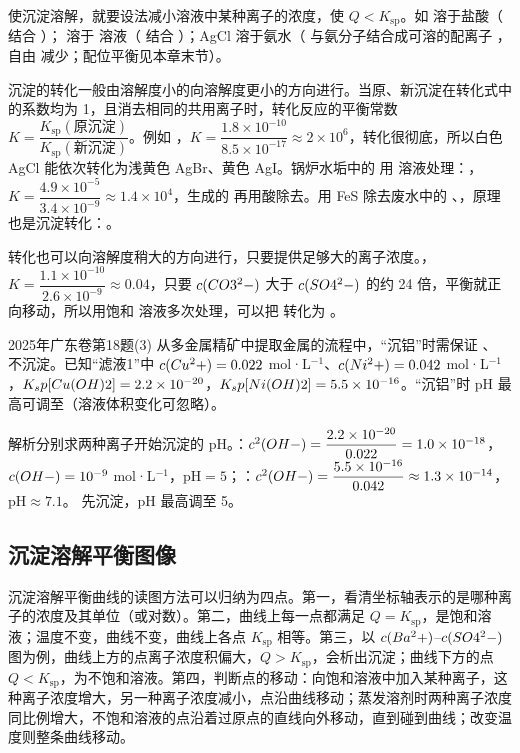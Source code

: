 使沉淀溶解，就要设法减小溶液中某种离子的浓度，使 $Q<K_\text{sp}$。如  溶于盐酸（ 结合 ）； 溶于  溶液（ 结合 ）；AgCl 溶于氨水（ 与氨分子结合成可溶的配离子 \ce{[Ag(NH3)2]+}，自由  减少；配位平衡见本章末节）。

沉淀的转化一般由溶解度小的向溶解度更小的方向进行。当原、新沉淀在转化式中的系数均为 1，且消去相同的共用离子时，转化反应的平衡常数 $K=\dfrac{K_\text{sp}(\text{原沉淀})}{K_\text{sp}(\text{新沉淀})}$。例如 ，$K=\dfrac{1.8\times10^{-10}}{8.5\times10^{-17}}\approx2\times10^6$，转化很彻底，所以白色 AgCl 能依次转化为浅黄色 AgBr、黄色 AgI。锅炉水垢中的  用  溶液处理：，$K=\dfrac{4.9\times10^{-5}}{3.4\times10^{-9}}\approx1.4\times10^4$，生成的  再用酸除去。用 FeS 除去废水中的 、，原理也是沉淀转化：。

转化也可以向溶解度稍大的方向进行，只要提供足够大的离子浓度。，$K=\dfrac{1.1\times10^{-10}}{2.6\times10^{-9}}\approx0.04$，只要 $c(CO3^2-)$ 大于 $c(SO4^2-)$ 的约 24 倍，平衡就正向移动，所以用饱和  溶液多次处理，可以把  转化为 。

\begin{zhenti}{2025年广东卷第18题(3)}
从多金属精矿中提取金属的流程中，“沉铝”时需保证 、 不沉淀。已知“滤液1”中 $c(Cu^2+)=0.022$ mol·L$^{-1}$、$c(Ni^2+)=0.042$ mol·L$^{-1}$，$K_sp[Cu(OH)2]=2.2\times10^{-20}$，$K_sp[Ni(OH)2]=5.5\times10^{-16}$。“沉铝”时 pH 最高可调至\tk（溶液体积变化可忽略）。

{\heiti 解析}\quad 分别求两种离子开始沉淀的 pH。：$c^2(OH-)=\dfrac{2.2\times10^{-20}}{0.022}=1.0\times10^{-18}$，$c(OH-)=10^{-9}$ mol·L$^{-1}$，pH$=5$；：$c^2(OH-)=\dfrac{5.5\times10^{-16}}{0.042}\approx1.3\times10^{-14}$，pH$\approx7.1$。 先沉淀，pH 最高调至 5。
\end{zhenti}

\subsection{沉淀溶解平衡图像}
沉淀溶解平衡曲线的读图方法可以归纳为四点。第一，看清坐标轴表示的是哪种离子的浓度及其单位（或对数）。第二，曲线上每一点都满足 $Q=K_\text{sp}$，是饱和溶液；温度不变，曲线不变，曲线上各点 $K_\text{sp}$ 相等。第三，以 $c(Ba^2+)$–$c(SO4^2-)$ 图为例，曲线上方的点离子浓度积偏大，$Q>K_\text{sp}$，会析出沉淀；曲线下方的点 $Q<K_\text{sp}$，为不饱和溶液。第四，判断点的移动：向饱和溶液中加入某种离子，这种离子浓度增大，另一种离子浓度减小，点沿曲线移动；蒸发溶剂时两种离子浓度同比例增大，不饱和溶液的点沿着过原点的直线向外移动，直到碰到曲线；改变温度则整条曲线移动。

